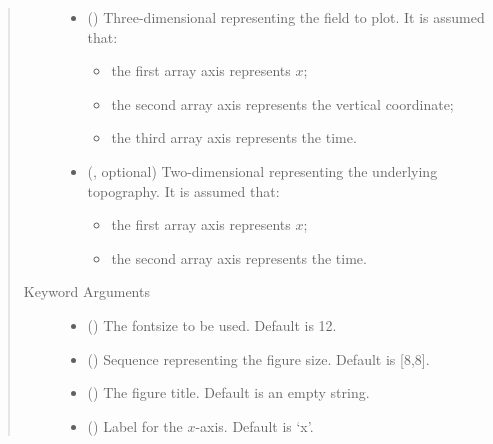 \documentclass[letterpaper,10pt,english]{sphinxmanual}
\begin{document}
\begin{fulllineitems}
\begin{quote}
\begin{description}
\begin{itemize}
\item {} 
 () \textendash{} 
Three-dimensional  representing the field to plot.
It is assumed that:
\begin{itemize}
\item {} 
the first array axis represents \(x\);

\item {} 
the second array axis represents the vertical coordinate;

\item {} 
the third array axis represents the time.

\end{itemize}


\item {} 
 (, optional) \textendash{} 
Two-dimensional  representing the underlying topography.
It is assumed that:
\begin{itemize}
\item {} 
the first array axis represents \(x\);

\item {} 
the second array axis represents the time.

\end{itemize}


\end{itemize}

\item[{Keyword Arguments}] \leavevmode\begin{itemize}
\item {} 
 () \textendash{} The fontsize to be used. Default is 12.

\item {} 
 () \textendash{} Sequence representing the figure size. Default is {[}8,8{]}.

\item {} 
 () \textendash{} The figure title. Default is an empty string.

\item {} 
 () \textendash{} Label for the \(x\)-axis. Default is ‘x’.


\end{itemize}
\end{description}
\end{quote}
\end{fulllineitems}
\end{document}
